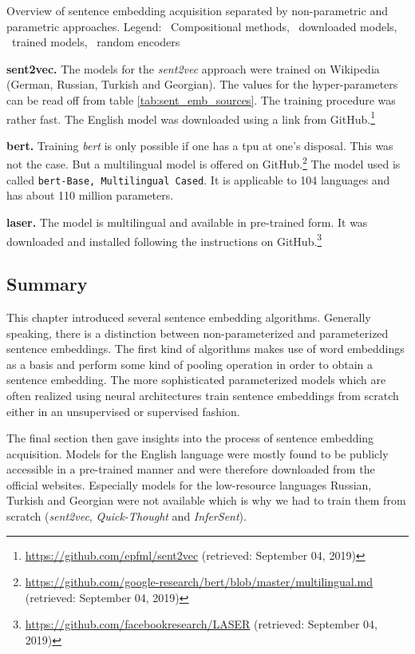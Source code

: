 \begin{table}
	\begin{adjustbox}{angle=90}
		
	\end{adjustbox}
	\vspace*{-5mm}
	\caption[Sources of sentence embeddings]
		{Overview of sentence embedding acquisition separated by non-parametric and parametric approaches.
		Legend: \faFilter\ Compositional methods, \faDownload\ downloaded models, \faCogs\ trained models,
		\faMagic\ random encoders}
	\label{tab:sent_emb_sources}
\end{table}

\textbf{sent2vec.} The models for the \textit{sent2vec} approach were trained on Wikipedia (German, Russian, Turkish and Georgian). The values for the hyper-parameters can be read off from table \vref{tab:sent_emb_sources}. The training procedure was rather fast. The English model was downloaded using a link from GitHub\github.\footnote{\url{https://github.com/epfml/sent2vec} (retrieved: September 04, 2019)}

\textbf{\gls{bert}.} Training \textit{\gls{bert}} is only possible if one has a \gls{tpu} at one's disposal. This was not the case. But a multilingual model is offered on GitHub\github.\footnote{\url{https://github.com/google-research/bert/blob/master/multilingual.md} (retrieved: September 04, 2019)} The model used is called \texttt{\gls{bert}-Base, Multilingual Cased}. It is applicable to 104 languages and has about 110 million parameters.

\textbf{\gls{laser}.} The model is multilingual and available in pre-trained form. It was downloaded and installed following the instructions on GitHub\github.\footnote{\url{https://github.com/facebookresearch/LASER} (retrieved: September 04, 2019)}

\subsection{Summary}
\label{sec:sent_embs_summary}

This chapter introduced several sentence embedding algorithms. Generally speaking, there is a distinction between non-parameterized and parameterized sentence embeddings. The first kind of algorithms makes use of word embeddings as a basis and perform some kind of pooling operation in order to obtain a sentence embedding. The more sophisticated parameterized models which are often realized using neural architectures train sentence embeddings from scratch either in an unsupervised or supervised fashion.

The final section then gave insights into the process of sentence embedding acquisition. Models for the English language were mostly found to be publicly accessible in a pre-trained manner and were therefore downloaded from the official websites. Especially models for the low-resource languages Russian, Turkish and Georgian were not available which is why we had to train them from scratch (\textit{sent2vec}, \textit{Quick-Thought} and \textit{InferSent}).
